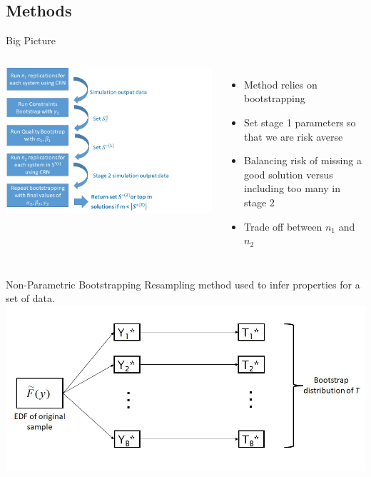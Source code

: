 \documentclass[aspectratio=169]{beamer}
\begin{document}
\subsection{Methods}
\begin{frame}{Big Picture}
\begin{columns}[c] %

\includegraphics[width=1.2\linewidth]{Overall_Process}

\begin{itemize}
\item Method relies on bootstrapping
\item Set stage 1 parameters so that we are risk averse
\item Balancing risk of missing a good solution versus including too many in stage 2
\item Trade off between $n_{1}$ and $n_{2}$
\end{itemize}

\end{columns}


\end{frame}
\begin{frame}{Non-Parametric Bootstrapping}
Resampling method used to infer properties for a set of data.
\includegraphics[width=1.0\linewidth]{Bootstrap_Diagram.jpg}
\end{frame}
\end{document}

